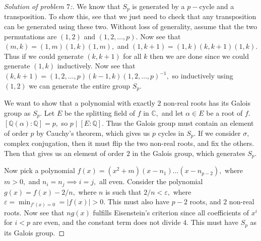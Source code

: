 \documentclass[letterpaper,11pt,twoside]{article}
\theoremstyle{proposition}
\theoremstyle{definition}
\theoremstyle{theorem}
\theoremstyle{definition}
\theoremstyle{definition}
\theoremstyle{definition}
\theoremstyle{lemma}
\theoremstyle{definition}
\theoremstyle{definition}
\theoremstyle{corollary}
\theoremstyle{definition}
\theoremstyle{definition}
\theoremstyle{definition}
\newcommand{\abs}[1]{\left \vert #1 \right \vert}
\renewcommand{\div}{\;\vert\;}
\begin{document}
	\begin{proof}[Solution of problem $7$:]
	We know that $S_p$ is generated by a $p-$cycle and a transposition. To show this, see that we just need to check that any transposition can be generated 
	using these two. Without loss of generality, assume that the two permutations are $(1, 2)$ and $(1,2, \dots, p).$ Now see that $(m,k)= (1,m)(1,k)(1,m),$ 
	and $(1,k+1)=(1,k)(k, k+1)(1,k).$ Thus if we could generate $(k,k+1)$ for all $k$ then we are done since we could generate $(1,k )$ inductively. Now see 
	that $(k,k+1)= (1,2,\dots,p)(k-1, k) (1,2,\dots,p)^{-1},$ so inductively using $(1,2)$ we can generate the entire group $S_p.$ 
	
	We want to show that a polynomial with exactly $2$ non-real roots has its Galois group as $S_p.$ 
	Let $E$ be the splitting field of $f$ in $\mathbb{C},$ and let $\alpha \in E$ be a root of $f.$ $[\mathbb{Q}(\alpha): \mathbb{Q}]=p,$ so $p \div [E: 
	\mathbb{Q}].$ Thus the Galois group must contain an element of order $p$ by Cauchy's theorem, which gives us $p$ cycles in $S_p.$ If we consider 
	$\sigma,$ complex conjugation, then it must flip the two non-real roots, and fix the others. Then that gives us an element of order $2$ in the Galois 
	group, which generates $S_p.$
	
	
	Now pick a polynomial $f(x)=(x^2+m)(x-n_1)\dots (x- n_{p-2}),$ where $m >0,$ and $n_i = n_j \implies i=j,$ all even. Consider the polynomial $g(x)=f(x)- 
	2/n,$ where $n$ is such that $2/n < \varepsilon,$ where $\varepsilon = \min_{f'(x)=0}= \abs{ f(x) } >0.$ This must also have $p-2$ roots, and $2$ 
	non-real roots. Now see that $ng(x)$ fulfills Eisenstein's criterion since all coefficients of $x^i$ for $i<p$ are even, and the constant term does not 
	divide $4.$  This must have $S_p$ as its Galois group.
	\end{proof}
	
	
	
	
\end{document}
